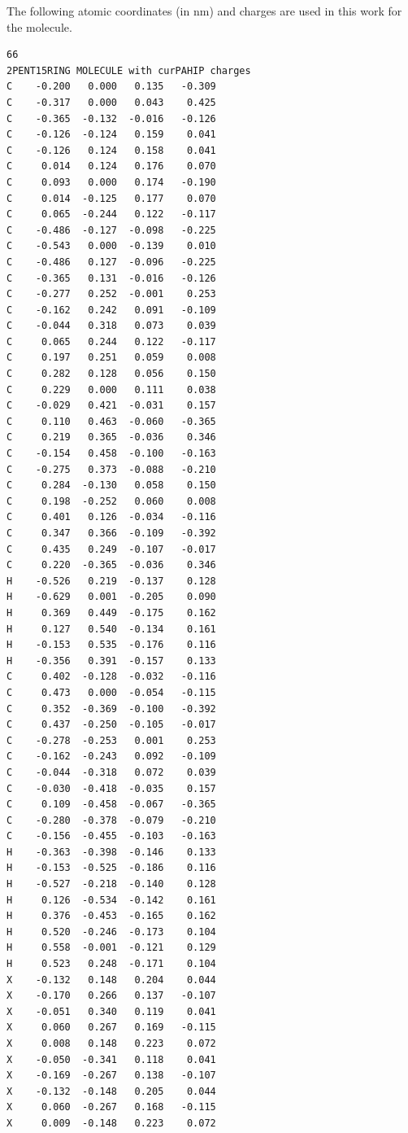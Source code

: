 The following atomic coordinates (in nm) and charges are used in this work for the  molecule.
%
\begin{verbatim}
66
2PENT15RING MOLECULE with curPAHIP charges
C    -0.200   0.000   0.135   -0.309
C    -0.317   0.000   0.043    0.425
C    -0.365  -0.132  -0.016   -0.126
C    -0.126  -0.124   0.159    0.041
C    -0.126   0.124   0.158    0.041
C     0.014   0.124   0.176    0.070
C     0.093   0.000   0.174   -0.190
C     0.014  -0.125   0.177    0.070
C     0.065  -0.244   0.122   -0.117
C    -0.486  -0.127  -0.098   -0.225
C    -0.543   0.000  -0.139    0.010
C    -0.486   0.127  -0.096   -0.225
C    -0.365   0.131  -0.016   -0.126
C    -0.277   0.252  -0.001    0.253
C    -0.162   0.242   0.091   -0.109
C    -0.044   0.318   0.073    0.039
C     0.065   0.244   0.122   -0.117
C     0.197   0.251   0.059    0.008
C     0.282   0.128   0.056    0.150
C     0.229   0.000   0.111    0.038
C    -0.029   0.421  -0.031    0.157
C     0.110   0.463  -0.060   -0.365
C     0.219   0.365  -0.036    0.346
C    -0.154   0.458  -0.100   -0.163
C    -0.275   0.373  -0.088   -0.210
C     0.284  -0.130   0.058    0.150
C     0.198  -0.252   0.060    0.008
C     0.401   0.126  -0.034   -0.116
C     0.347   0.366  -0.109   -0.392
C     0.435   0.249  -0.107   -0.017
C     0.220  -0.365  -0.036    0.346
H    -0.526   0.219  -0.137    0.128
H    -0.629   0.001  -0.205    0.090
H     0.369   0.449  -0.175    0.162
H     0.127   0.540  -0.134    0.161
H    -0.153   0.535  -0.176    0.116
H    -0.356   0.391  -0.157    0.133
C     0.402  -0.128  -0.032   -0.116
C     0.473   0.000  -0.054   -0.115
C     0.352  -0.369  -0.100   -0.392
C     0.437  -0.250  -0.105   -0.017
C    -0.278  -0.253   0.001    0.253
C    -0.162  -0.243   0.092   -0.109
C    -0.044  -0.318   0.072    0.039
C    -0.030  -0.418  -0.035    0.157
C     0.109  -0.458  -0.067   -0.365
C    -0.280  -0.378  -0.079   -0.210
C    -0.156  -0.455  -0.103   -0.163
H    -0.363  -0.398  -0.146    0.133
H    -0.153  -0.525  -0.186    0.116
H    -0.527  -0.218  -0.140    0.128
H     0.126  -0.534  -0.142    0.161
H     0.376  -0.453  -0.165    0.162
H     0.520  -0.246  -0.173    0.104
H     0.558  -0.001  -0.121    0.129
H     0.523   0.248  -0.171    0.104
X    -0.132   0.148   0.204    0.044
X    -0.170   0.266   0.137   -0.107
X    -0.051   0.340   0.119    0.041
X     0.060   0.267   0.169   -0.115
X     0.008   0.148   0.223    0.072
X    -0.050  -0.341   0.118    0.041
X    -0.169  -0.267   0.138   -0.107
X    -0.132  -0.148   0.205    0.044
X     0.060  -0.267   0.168   -0.115
X     0.009  -0.148   0.223    0.072

\end{verbatim}


